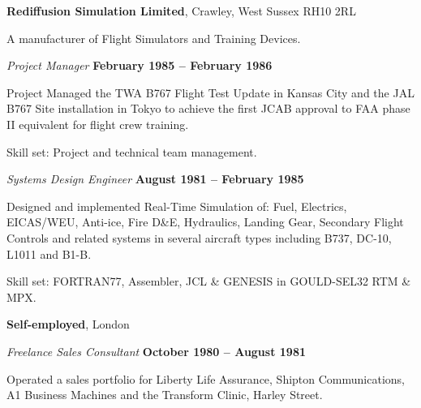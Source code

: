 \documentclass[10pt]{article}
\newenvironment{outerlist}[1][\enskip\textbullet]%
        {\begin{itemize}[#1]}{\end{itemize}%
         \vspace{-.6\baselineskip}}
\newenvironment{innerlist}[1][\enskip\textbullet]%
        {\begin{compactitem}[#1]}{\end{compactitem}}
\newcommand{\blankline}{\quad\pagebreak[2]}
\begin{document}
\blankline

\textbf{Rediffusion Simulation Limited}, Crawley, West Sussex RH10 2RL

A manufacturer of Flight Simulators and Training Devices.

\begin{outerlist}

\item[] \textit{Project Manager}%
        \hfill \textbf{February 1985 -- February 1986}
\begin{innerlist}
\item Project Managed the TWA B767 Flight Test Update in Kansas City and the JAL B767 Site installation in Tokyo to achieve the first JCAB approval to FAA phase II equivalent for flight crew training.

\item Skill set: Project and technical team management.

\end{innerlist}

\item[] \textit{Systems Design Engineer}%
        \hfill \textbf{August 1981 -- February 1985}
\begin{innerlist}
\item Designed and implemented Real-Time Simulation of: Fuel, Electrics, EICAS/WEU, Anti-ice, Fire D\&E, Hydraulics, Landing Gear, Secondary Flight Controls and related systems in several aircraft types including B737, DC-10, L1011 and B1-B.

\item Skill set: FORTRAN77, Assembler, JCL \& GENESIS in GOULD-SEL32 RTM \& MPX.

\end{innerlist}

\end{outerlist}


\blankline

\textbf{Self-employed}, London

\begin{outerlist}

\item[] \textit{Freelance Sales Consultant}%
        \hfill \textbf{October 1980 -- August 1981}
\begin{innerlist}
\item Operated a sales portfolio for Liberty Life Assurance, Shipton Communications, A1 Business Machines and the Transform Clinic, Harley Street.

\end{innerlist}

\end{outerlist}
\end{document}
